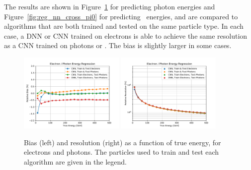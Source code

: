 The results are shown in Figure~\ref{fig:reg_nn_cross_gamma} for predicting photon energies and Figure~\ref{fig:reg_nn_cross_pi0} for predicting \pizero\ energies, and are compared to algorithms that are both trained and tested on the same particle type.  In each case, a DNN or CNN trained on electrons is able to achieve the same resolution as a CNN trained on photons or \pizero.  The bias is slightly larger in some cases.

\begin{figure}[hbp]
\centering
\includegraphics[width=0.45\textwidth]{Images/Calo/bias_vs_E_EleGammaFixed_nn_cross_zoom.pdf}
\includegraphics[width=0.45\textwidth]{Images/Calo/res_vs_E_EleGammaFixed_nn_cross_fits.pdf}
\caption{Bias (left) and resolution (right) as a function of true energy, for electrons and photons.  The particles used to train and test each algorithm are given in the legend.
}
\label{fig:reg_nn_cross_gamma}
\end{figure}

